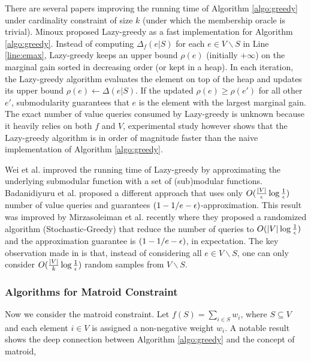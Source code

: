 There are several papers improving the running time of Algorithm \ref{algo:greedy} under cardinality constraint of size $k$ (under which the membership oracle is trivial). Minoux \cite{M78} proposed {\sc Lazy-greedy} as a fast implementation for Algorithm \ref{algo:greedy}. Instead of computing $\Delta_f(e|S)$ for each $e\in V\backslash S$ in Line \ref{line:emax},  {\sc Lazy-greedy} keeps an upper bound $\rho(e)$ (initially $+\infty$) on the marginal gain sorted in decreasing order (or kept in a heap). In each iteration, the {\sc Lazy-greedy} algorithm evaluates the element on top of the heap and updates its upper bound $\rho(e) \gets \Delta(e|S)$. If the updated $\rho(e) \geq \rho(e')$ for all other $e'$, submodularity guarantees that $e$ is the element with the largest marginal gain. The exact number of value queries consumed by {\sc Lazy-greedy} is unknown because it heavily relies on both $f$ and $V$, experimental study however shows that the {\sc Lazy-greedy} algorithm is in order of magnitude faster than the naive implementation of Algorithm \ref{algo:greedy}.  

Wei et al. \cite{WIB14} improved the running time of {\sc Lazy-greedy} by approximating the underlying submodular function with a set of (sub)modular functions. Badanidiyuru et al. \cite{BV14} proposed a different approach that uses only $O(\frac{|V|}{\epsilon}\log \frac{1}{\epsilon})$ number of value queries and guarantees $(1 - 1/e - \epsilon)$-approximation. This result was improved by Mirzasoleiman et al. \cite{MBK+15} recently where they proposed a randomized algorithm ({\sc Stochastic-Greedy}) that reduce the number of queries to  $O(|V| \log \frac{1}{\epsilon})$ and the approximation guarantee is $(1 - 1/e - \epsilon)$, in expectation. The key observation made in \cite{MBK+15} is that, instead of considering all $e\in V\backslash S$, one can only consider $O(\frac{|V|}{k}\log \frac{1}{\epsilon})$  random samples from $V\backslash S$. 



 







\subsubsection{Algorithms for Matroid Constraint}
Now we consider the matroid constraint. Let $f(S) = \sum_{i\in S} w_i$, where $S \subseteq V$ and each element $i\in V$ is assigned a non-negative weight $w_i$. A notable result shows the deep connection between Algorithm \ref{algo:greedy} and the concept of matroid,

